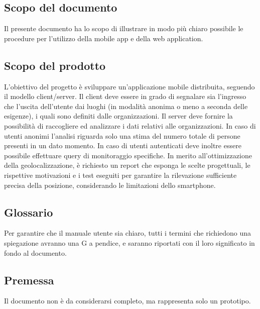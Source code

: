\documentclass[../manuale-utente.tex]{subfiles}
\begin{document}
\subsection{Scopo del documento}%
\label{sub:scopo_del_documento}
Il presente documento ha lo scopo di illustrare in modo più chiaro possibile le procedure per l'utilizzo della mobile app e della web application.

\subsection{Scopo del prodotto}%
\label{sub:scopo_del_prodotto}
L'obiettivo del progetto è sviluppare un'applicazione mobile distribuita, seguendo il modello client/server.
Il client deve essere in grado di segnalare sia l'ingresso che l'uscita dell'utente dai luoghi (in modalità anonima o meno a seconda delle esigenze), i quali sono definiti dalle organizzazioni.
Il server deve fornire la possibilità di raccogliere ed analizzare i dati relativi alle organizzazioni.
In caso di utenti anonimi l'analisi riguarda solo una stima del numero totale di persone presenti in un dato momento.
In caso di utenti autenticati deve inoltre essere possibile effettuare query di monitoraggio specifiche.
In merito all'ottimizzazione della geolocalizzazione, è richiesto un report che esponga le scelte progettuali, le rispettive motivazioni e i test eseguiti per garantire la rilevazione sufficiente precisa della posizione, considerando le limitazioni dello smartphone.

\subsection{Glossario}%
\label{sub:glossario}
Per garantire che il manuale utente sia chiaro, tutti i termini che richiedono una spiegazione avranno una G a pendice, e saranno riportati con il loro significato in fondo al documento.

\subsection{Premessa}%
\label{sub:glossario}
Il documento non è da considerarsi completo, ma rappresenta solo un prototipo.
\end{document}

